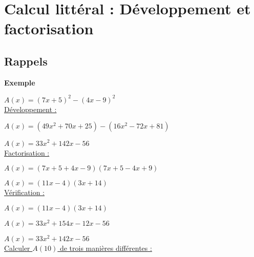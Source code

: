 \ifdefined\COMPLETE
\else
    
    
\fi


\section{Calcul littéral : Développement et factorisation}

\subsection{Rappels}

\textbf{Exemple }

$ A(x) = \left(7x + 5\right)^2 - \left(4x-9\right)^2 $ \\

\underline{Développement :}

$ A(x) = \left(49x^2 + 70x + 25\right)-\left(16x^2-72x+81\right) $

$A(x) = 33x^2+142x-56$ \\


\underline{Factorisation :}

$ A(x) = \left(7x + 5 + 4x -9\right)\left(7x+5-4x+9\right) $

$ A(x) = \left(11x-4\right)\left(3x+14\right) $ \\

\underline{Vérification :}

$ A(x) = \left(11x-4\right)\left(3x+14\right) $

$ A(x) = 33x^2 + 154x - 12x - 56 $

$ A(x) = 33x^2 + 142x - 56 $ \\

\underline{Calculer $ A(10) $ de trois manières différentes :} \\

